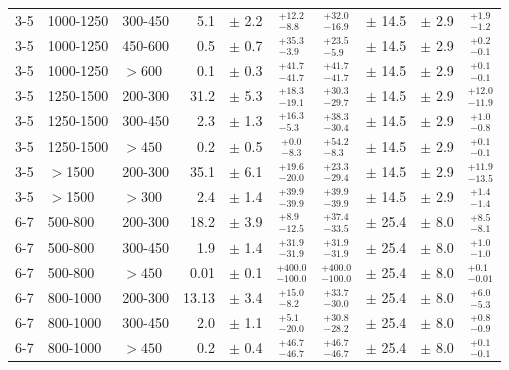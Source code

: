 \begin{table}[!hp]
{\begin{tabular}{lll|rc|cccc|c}
      3-5   & 1000-1250  & 300-450 & 5.1   & $\pm$  2.2  & $^{+12.2}_{-8.8}$ & $^{+32.0}_{-16.9}$ & $\pm$  14.5   & $\pm$ 2.9 & $^{+1.9}_{-1.2}$ \\
      3-5   & 1000-1250  & 450-600 & 0.5   & $\pm$  0.7  & $^{+35.3}_{-3.9}$ & $^{+23.5}_{-5.9}$ &  $\pm$  14.5   & $\pm$ 2.9 & $^{+0.2}_{-0.1}$ \\
      3-5   & 1000-1250  & $>600$  & 0.1   & $\pm$  0.3  & $^{+41.7}_{-41.7}$ & $^{+41.7}_{-41.7}$ & $\pm$ 14.5   &  $\pm$ 2.9 & $^{+0.1}_{-0.1}$ \\
      \midrule
      3-5   & 1250-1500  & 200-300 & 31.2  & $\pm$  5.3  & $^{+18.3}_{-19.1}$ & $^{+30.3}_{-29.7}$ & $\pm$  14.5  & $\pm$ 2.9 & $^{+12.0}_{-11.9}$\\
      3-5   & 1250-1500  & 300-450 & 2.3   & $\pm$  1.3  & $^{+16.3}_{-5.3}$ & $^{+38.3}_{-30.4}$ & $\pm$  14.5  & $\pm$ 2.9 & $^{+1.0}_{-0.8}$ \\
      3-5   & 1250-1500  & $>450$  & 0.2   & $\pm$  0.5  & $^{+0.0}_{-8.3}$ & $^{+54.2}_{-8.3}$  & $\pm$   14.5 & $\pm$ 2.9 & $^{+0.1}_{-0.1}$  \\
      \midrule
      3-5   & $>$1500    & 200-300 & 35.1  & $\pm$  6.1  & $^{+19.6}_{-20.0}$ & $^{+23.3}_{-29.4}$ & $\pm$   14.5 & $\pm$ 2.9 & $^{+11.9}_{-13.5}$ \\
      3-5   & $>$1500    & $>300$  & 2.4   & $\pm$  1.4  & $^{+39.9}_{-39.9}$ & $^{+39.9}_{-39.9}$ & $\pm$   14.5 & $\pm$ 2.9 & $^{+1.4}_{-1.4}$ \\
      \midrule 
      \midrule
      6-7   & 500-800   & 200-300  &  18.2 & $\pm$  3.9  & $^{+8.9}_{-12.5}$ & $^{+37.4}_{-33.5}$ & $\pm$  25.4  & $\pm$ 8.0 & $^{+8.5}_{-8.1}$  \\
      6-7   & 500-800   & 300-450  &  1.9  & $\pm$  1.4  & $^{+31.9}_{-31.9}$ & $^{+31.9}_{-31.9}$ & $\pm$  25.4 & $\pm$ 8.0 & $^{+1.0}_{-1.0}$  \\
      6-7   & 500-800   & $>450$   &  0.01 & $\pm$  0.1  & $^{+400.0}_{-100.0}$ & $^{+400.0}_{-100.0}$ & $\pm$  25.4 & $\pm$ 8.0 & $^{+0.1}_{-0.01}$\\
      \midrule
      6-7   & 800-1000  & 200-300  &  13.13& $\pm$  3.4  & $^{+15.0}_{-8.2}$ & $^{+33.7}_{-30.0}$ & $\pm$  25.4  & $\pm$ 8.0 & $^{+6.0}_{-5.3}$  \\
      6-7   & 800-1000  & 300-450  &  2.0  & $\pm$  1.1  & $^{+5.1}_{-20.0}$ & $^{+30.8}_{-28.2}$ & $\pm$  25.4  & $\pm$ 8.0 & $^{+0.8}_{-0.9}$  \\
      6-7   & 800-1000  & $>450$   &  0.2  & $\pm$  0.4  & $^{+46.7}_{-46.7}$ & $^{+46.7}_{-46.7}$ & $\pm$  25.4 & $\pm$ 8.0 & $^{+0.1}_{-0.1}$  \\ 

\end{tabular}}
\end{table}
